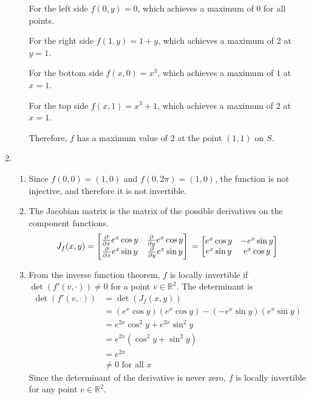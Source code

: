 \documentclass{report}
\newcommand{\pdiv}[1]{\frac{\partial}{\partial #1}}
\begin{document}
\begin{enumerate}
\begin{enumerate}
		For the left side $f(0, y) = 0$,
		which achieves a maximum of $0$ for all points.

		For the right side $f(1, y) = 1+y$,
		which achieves a maximum of $2$ at $y=1$.

		For the bottom side $f(x, 0) = x^3$, 
		which achieves a maximum of $1$ at $x=1$.

		For the top side $f(x, 1) = x^3 + 1$,
		which achieves a maximum of $2$ at $x=1$.

		Therefore, $f$ has a maximum value of $2$ 
		at the point $(1, 1)$ on $S$. 
	\end{enumerate}
		
	\item 
	\begin{enumerate}
		\item 
		Since $f(0,0) = (1, 0)$ and $f(0, 2\pi) = (1, 0)$,
		the function is not injective, and therefore it is not invertible.

		\item 
		The Jacobian matrix is the matrix of the possible derivatives 
		on the component functions.
		\[
			J_f(x,y) 
			= \begin{bmatrix}
				\pdiv{x} e^x\cos y & \pdiv{y} e^x\cos y \\
				\pdiv{x} e^x\sin y & \pdiv{y} e^x\sin y
			\end{bmatrix} \\
			= \begin{bmatrix}
				e^x\cos y & -e^x\sin y \\
				e^x\sin y & e^x\cos y
			\end{bmatrix}
		\]

		\item 
		From the inverse function theorem,
		$f$ is locally invertible if $\det(f'(v,\cdot)) \neq 0$
		for a point $v \in \mathbb{R}^2$.
		The determinant is 
		\begin{align*}
			\det(f'(v,\cdot))  
			&= \det (J_f(x,y)) \\
			&= (e^x\cos y)(e^x\cos y) - (-e^x\sin y)(e^x\sin y) \\
			&= e^{2x}\cos^2y + e^{2x}\sin^2y \\
			&= e^{2x}(\cos^2y + \sin^2y) \\
			&= e^{2x} \\
			&\neq 0 \text{ for all $x$}
		\end{align*}		
		Since the determinant of the derivative is never zero,
		$f$ is locally invertible for any point $v \in \mathbb{R}^2$.
	\end{enumerate}
\end{enumerate}
\end{document}
